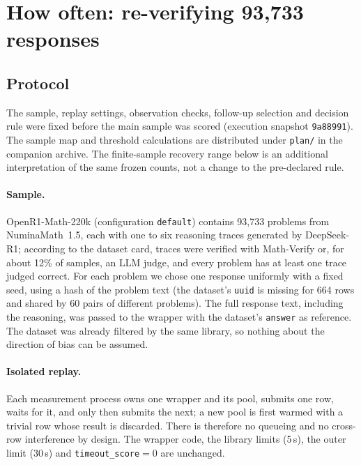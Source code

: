 \documentclass[10pt,a4paper]{article}
\let\cite\citep
\newcommand{\mv}{Math-Verify}
\begin{document}
\section{How often: re-verifying 93,733 responses}
\label{sec:prevalence}

\subsection{Protocol}

The sample, replay settings, observation checks, follow-up selection and
decision rule were fixed before the main sample was scored (execution
snapshot \texttt{9a88991}). The sample map and threshold calculations are
distributed under \texttt{plan/} in the companion archive. The finite-sample
recovery range below is an additional interpretation of the same frozen
counts, not a change to the pre-declared rule.

\paragraph{Sample.}
OpenR1-Math-220k \cite{openr1math} (configuration \texttt{default}) contains
93,733 problems from NuminaMath~1.5, each with one to six reasoning traces
generated by DeepSeek-R1; according to the dataset card, traces were verified
with \mv{} or, for about 12\% of samples, an LLM judge, and every problem has
at least one trace judged correct. For each
problem we chose one response uniformly with a fixed seed, using a hash of
the problem text (the dataset's \texttt{uuid} is missing for 664 rows and
shared by 60 pairs of different problems). The full response text, including
the reasoning, was passed to the wrapper with the dataset's \texttt{answer}
as reference. The dataset was already filtered by the same library, so
nothing about the direction of bias can be assumed.

\paragraph{Isolated replay.}
Each measurement process owns one wrapper and its pool, submits one row,
waits for it, and only then submits the next; a new pool is first warmed with
a trivial row whose result is discarded. There is therefore no queueing and
no cross-row interference by design. The wrapper code, the library limits
(5\,s), the outer limit (30\,s) and \texttt{timeout\_score}$=0$ are unchanged.
\end{document}
